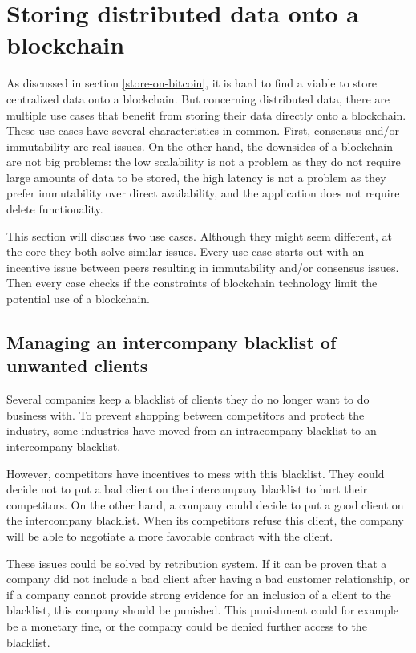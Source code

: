 \section{Storing distributed data onto a blockchain}
\label{resource-allocation}

As discussed in section \ref{store-on-bitcoin}, it is hard to find a viable to store centralized data onto a blockchain. But concerning distributed data, there are multiple use cases that benefit from storing their data directly onto a blockchain. These use cases have several characteristics in common. First, consensus and/or immutability are real issues. On the other hand, the downsides of a blockchain are not big problems: the low scalability is not a problem as they do not require large amounts of data to be stored, the high latency is not a problem as they prefer immutability over direct availability, and the application does not require delete functionality. 

This section will discuss two use cases. Although they might seem different, at the core they both solve similar issues. Every use case starts out with an incentive issue between peers resulting in immutability and/or consensus issues. Then every case checks if the constraints of blockchain technology limit the potential use of a blockchain.

\subsection{Managing an intercompany blacklist of unwanted clients}
\label{blacklist}

Several companies keep a blacklist of clients they do no longer want to do business with. To prevent shopping between competitors and protect the industry, some industries have moved from an intracompany blacklist to an intercompany blacklist. 

However, competitors have incentives to mess with this blacklist. They could decide not to put a bad client on the intercompany blacklist to hurt their competitors. On the other hand, a company could decide to put a good client on the intercompany blacklist. When its competitors refuse this client, the company will be able to negotiate a more favorable contract with the client.

These issues could be solved by retribution system. If it can be proven that a company did not include a bad client after having a bad customer relationship, or if a company cannot provide strong evidence for an inclusion of a client to the blacklist, this company should be punished. This punishment could for example be a monetary fine, or the company could be denied further access to the blacklist.

